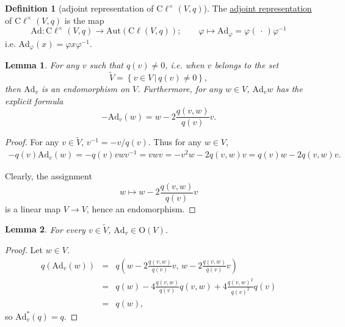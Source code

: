 \documentclass[a4paper]{report}
\newcommand{\defn}[1]{\ul{#1}}
\newcommand{\cliff}{\mathrm{C}\ell}
\newcommand{\Ad}{\mathrm{Ad}}
\newcommand{\Or}{\mathrm{O}}
\theoremstyle{definition}
\newtheorem{definition}{Definition}[section]
\theoremstyle{plain}
\newtheorem{lemma}{Lemma}[section]
\theoremstyle{remark}
\begin{document}
\begin{definition}[adjoint representation of $\cliff^{\times}(V ,q)$]
  \label{def:adjointrepresentationofcliffordalgebra}
  The \defn{adjoint representation} of $\cliff^{\times}(V, q)$ is the map
  \begin{equation*}
    \Ad\colon \cliff^{\times}(V, q) \to \mathrm{Aut}(\cliff(V, q));\qquad \varphi \mapsto \Ad_{\varphi} = \varphi(\,\cdot\,) \varphi^{-1}
  \end{equation*}
  i.e. $\Ad_{\varphi}(x) = \varphi x \varphi^{-1}$.
\end{definition}

\begin{lemma}
  \label{lemma:expressionforad}
  For any $v$ such that $q(v) \neq 0$, i.e. when $v$ belongs to the set
  \begin{equation*}
    \tilde{V} = \left\{ v \in V\,\big|\, q(v) \neq 0 \right\},
  \end{equation*}
  then $\Ad_{v}$ is an endomorphism on $V$. Furthermore, for any $w \in V$, $\Ad_{v}w$ has the explicit formula
  \begin{equation*}
    -\Ad_{v}(w) = w - 2\frac{q(v, w)}{q(v)}v.
  \end{equation*}
\end{lemma}
\begin{proof}
  For any $v \in \tilde{V}$, $v^{-1} = -v/q(v)$. Thus for any $w \in V$,
  \begin{align*}
    -q(v) \Ad_{v}(w) = -q(v) vwv^{-1} = vwv = -v^2 w -2q(v, w)v = q(v) w - 2q(v,w) v.
  \end{align*}

  Clearly, the assignment
  \begin{equation*}
    w \mapsto w - 2\frac{q(v, w)}{q(v)}v
  \end{equation*}
  is a linear map $V \to V$, hence an endomorphism.
\end{proof}

\begin{lemma}
  For every $v \in \tilde{V}$, $\Ad_{v} \in \Or(V)$.
\end{lemma}
\begin{proof}
  Let $w \in V$.
  \begin{eqnarray*}
    q(\Ad_{v}(w)) &=& q\left(w - 2\frac{q(v,w)}{q(v)} v,\, w - 2\frac{q(v,w)}{q(v)} v\right) \\
    &=& q(w) - 4\frac{q(v,w)}{q(v)}q(v, w) + 4\frac{q(v, w)^{2}}{q(v)^{2}} q(v) \\
    &=& q(w),
  \end{eqnarray*} 
  so $\Ad_{v}^{*}(q) = q$.
\end{proof}
\end{document}
